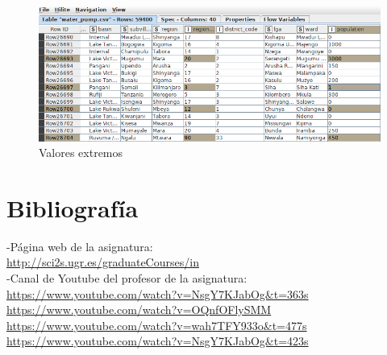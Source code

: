 	\begin{figure}[H]
		\centering
		\includegraphics[width=.7\textwidth]{img/media.png}
		\caption{Valores extremos}
	\end{figure}
	
	
	\section{Bibliografía}
	
	-Página web de la asignatura:\\
	\href{url}{http://sci2s.ugr.es/graduateCourses/in} \\
	
	-Canal de Youtube del profesor de la asignatura: \\
	\href{url}{https://www.youtube.com/watch?v=NsgY7KJabOg\&t=363s} \\
	\href{url}{https://www.youtube.com/watch?v=OQnfOFlySMM} \\
	\href{url}{https://www.youtube.com/watch?v=wah7TFY933o\&t=477s} \\
	\href{url}{https://www.youtube.com/watch?v=NsgY7KJabOg\&t=423s} \\
	
	
	\newpage
	
	
	
	

		
	